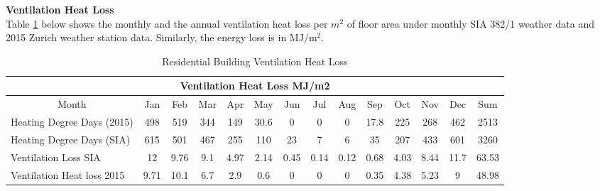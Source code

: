 \documentclass[a4paper, oneside]{discothesis}
\begin{document}
		\textbf{Ventilation Heat Loss}\\
		Table \ref{tab:HonggVentLoss380} below shows the monthly and the annual ventilation heat loss per $m^2$ of floor area under monthly SIA 382/1 weather data and 2015 Zurich weather station data. Similarly, the energy loss is in MJ/m$^2$.\\
		\begin{table}[H]
		\centering
		\small
		\caption{Residential Building Ventilation Heat Loss}
		    \begin{tabular}{|p{6.855em}ccccccccccccc|}
		    \toprule
		    \multicolumn{14}{|c|}{Ventilation Heat Loss MJ/m2} \\
		    \midrule
		    \multicolumn{1}{|c}{Month} & Jan  & Feb  & Mar  & Apr  & May  & Jun  & Jul  & Aug  & Sep  & Oct  & Nov  & Dec  & Sum \\
		    \midrule
		    Heating Degree Days (2015) & 498  & 519  & 344  & 149  & 30.6 & 0    & 0    & 0    & 17.8 & 225  & 268  & 462  & 2513 \\
		    Heating Degree Days (SIA) & 615  & 501  & 467  & 255  & 110  & 23   & 7    & 6    & 35   & 207  & 433  & 601  & 3260 \\
		    Ventilation Loss SIA & 12   & 9.76 & 9.1  & 4.97 & 2.14 & 0.45 & 0.14 & 0.12 & 0.68 & 4.03 & 8.44 & 11.7 & 63.53 \\
		    Ventilation Heat loss 2015 & 9.71 & 10.1 & 6.7  & 2.9  & 0.6  & 0    & 0    & 0    & 0.35 & 4.38 & 5.23 & 9    & 48.98 \\
		    \bottomrule
		    \end{tabular}%

		  \label{tab:HonggVentLoss380}%
		\end{table}%
\end{document}
